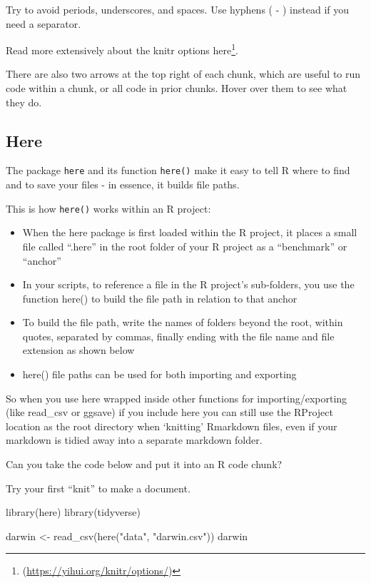 \documentclass[
]{book}
\makeatletter
\newenvironment{Shaded}{\begin{snugshade}}{\end{snugshade}}
\newcommand{\FunctionTok}[1]{\textcolor[rgb]{0.00,0.00,0.00}{#1}}
\newcommand{\NormalTok}[1]{#1}
\newcommand{\OtherTok}[1]{\textcolor[rgb]{0.56,0.35,0.01}{#1}}
\newcommand{\StringTok}[1]{\textcolor[rgb]{0.31,0.60,0.02}{#1}}
\newenvironment{kframe}{%
\medskip{}
\setlength{\fboxsep}{.8em}
 \def\at@end@of@kframe{}%
 \ifinner\ifhmode%
  \def\at@end@of@kframe{\end{minipage}}%
  \begin{minipage}{\columnwidth}%
 \fi\fi%
 \def\FrameCommand##1{\hskip\@totalleftmargin \hskip-\fboxsep
 \colorbox{shadecolor}{##1}\hskip-\fboxsep
     \hskip-\linewidth \hskip-\@totalleftmargin \hskip\columnwidth}%
 \MakeFramed {\advance\hsize-\width
   \@totalleftmargin\z@ \linewidth\hsize
   \@setminipage}}%
 {\par\unskip\endMakeFramed%
 \at@end@of@kframe}
\newenvironment{block}[1]
  {
  \begin{itemize}
  \renewcommand{\labelitemi}{
    \raisebox{-.7\height}[0pt][0pt]{
      {\setkeys{Gin}{width=3em,keepaspectratio}\texttt{[image: images/\#1]}}
    }
  }
  \setlength{\fboxsep}{1em}
  \begin{kframe}
  \item
  }
  {
  \end{kframe}
  \end{itemize}
  }
\newenvironment{rmdquestion}
  {\begin{block}{question}}
  {\end{block}}
\makeatother
\begin{document}
Try to avoid periods, underscores, and spaces. Use hyphens ( - ) instead if you need a separator.

Read more extensively about the knitr options here\footnote{(\url{https://yihui.org/knitr/options/})}.

There are also two arrows at the top right of each chunk, which are useful to run code within a chunk, or all code in prior chunks. Hover over them to see what they do.

\hypertarget{here}{%
\subsection{Here}\label{here}}

The package \texttt{here} \citet{R-here} and its function \texttt{here()} make it easy to tell R where to find and to save your files - in essence, it builds file paths.

This is how \texttt{here()} works within an R project:

\begin{itemize}
\item
  When the here package is first loaded within the R project, it places a small file called ``.here'' in the root folder of your R project as a ``benchmark'' or ``anchor''
\item
  In your scripts, to reference a file in the R project's sub-folders, you use the function here() to build the file path in relation to that anchor
\item
  To build the file path, write the names of folders beyond the root, within quotes, separated by commas, finally ending with the file name and file extension as shown below
\item
  here() file paths can be used for both importing and exporting
\end{itemize}

So when you use here wrapped inside other functions for importing/exporting (like read\_csv or ggsave) if you include here you can still use the RProject location as the root directory when `knitting' Rmarkdown files, even if your markdown is tidied away into a separate markdown folder.

\begin{rmdquestion}
Can you take the code below and put it into an R code chunk?

Try your first ``knit'' to make a document.
\end{rmdquestion}

\begin{Shaded}
\begin{Highlighting}[]
\FunctionTok{library}\NormalTok{(here)}
\FunctionTok{library}\NormalTok{(tidyverse)}

\NormalTok{darwin }\OtherTok{\textless{}{-}} \FunctionTok{read\_csv}\NormalTok{(}\FunctionTok{here}\NormalTok{(}\StringTok{"data"}\NormalTok{, }\StringTok{"darwin.csv"}\NormalTok{))}
\NormalTok{darwin}
\end{Highlighting}
\end{Shaded}
\end{document}
